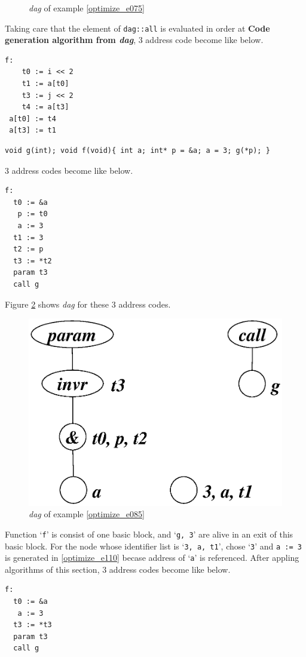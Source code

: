 \begin{Example}
\begin{figure}[htbp]
\begin{center}
\caption{{\em dag} of example \ref{optimize_e075}}
\label{optimize_e076}
\end{center}
\end{figure}
Taking care that the element of {\tt{dag::all}}
is evaluated in order at
{\bf Code generation algorithm from {\em dag}},
3 address code become like below.
\begin{verbatim}
f:
    t0 := i << 2
    t1 := a[t0]
    t3 := j << 2
    t4 := a[t3]
 a[t0] := t4
 a[t3] := t1
\end{verbatim}
\end{Example}

\begin{Example}
\label{optimize_e085}
\begin{verbatim}
void g(int); void f(void){ int a; int* p = &a; a = 3; g(*p); }
\end{verbatim}
3 address codes become like below.
\begin{verbatim}
f:
  t0 := &a
   p := t0
   a := 3
  t1 := 3
  t2 := p
  t3 := *t2
  param t3
  call g
\end{verbatim}
Figure \ref{optimize_e086} shows {\em dag} for these 3 address codes.
\begin{figure}[htbp]
\begin{center}
\includegraphics[width=0.7\linewidth,height=0.529\linewidth]{opt036.eps}
\caption{{\em dag} of example \ref{optimize_e085}}
\label{optimize_e086}
\end{center}
\end{figure}
Function `{\tt{f}}' is consist of one basic block,
and `{\tt{g, 3}}' are alive in an exit of this basic block.
For the node whose identifier list is `{\tt{3, a, t1}}',
chose `{\tt{3}}' and {\tt{a := 3}} is generated in 
\ref{optimize_e110} becase address of `{\tt{a}}' is referenced.
After appling algorithms of this section,
3 address codes become like below.
\begin{verbatim}
f:
  t0 := &a
   a := 3
  t3 := *t3
  param t3
  call g
\end{verbatim}
\end{Example}

